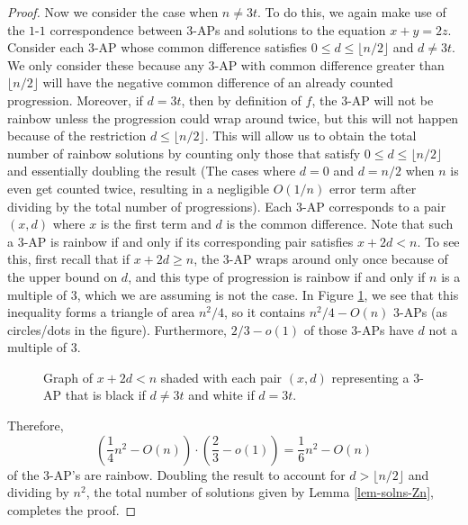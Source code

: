\begin{proof}
    Now we consider the case when $n \neq 3t$. To do this, we again make use of the $1$-$1$ correspondence between $3$-APs and solutions to the equation $x + y = 2z$. Consider each $3$-AP whose common difference satisfies $0 \leq d \leq \lfloor n/2 \rfloor$ and $d \neq 3t$. We only consider these because any $3$-AP with common difference greater than $\lfloor n/2 \rfloor$ will have the negative common difference of an already counted progression. Moreover, if $d = 3t$, then by definition of $f$, the $3$-AP will not be rainbow unless the progression could wrap around twice, but this will not happen because of the restriction $d \leq \lfloor n/2 \rfloor$. This will allow us to obtain the total number of rainbow solutions by counting only those that satisfy $0 \leq d \leq \lfloor n/2 \rfloor$ and essentially doubling the result (The cases where $d = 0$ and $d = n/2$ when $n$ is even get counted twice, resulting in a negligible $O(1/n)$ error term after dividing by the total number of progressions). Each $3$-AP corresponds to a pair $(x, d)$ where $x$ is the first term and $d$ is the common difference. Note that such a $3$-AP is rainbow if and only if its corresponding pair satisfies $x + 2d < n$. To see this, first recall that if $x + 2d \geq n$, the 3-AP wraps around only once because of the upper bound on $d$, and this type of progression is rainbow if and only if $n$ is a multiple of 3, which we are assuming is not the case. In Figure \ref{fig:graph}, we see that this inequality forms a triangle of area $n^2/4$, so it contains $n^2/4 - O(n)$ 3-APs (as circles/dots in the figure). Furthermore, $2/3 - o(1)$ of those $3$-APs have $d$ not a multiple of $3$. 
    \begin{figure}%
        \centering
{}
        \caption{Graph of $x + 2d < n$ shaded with each pair $(x, d)$ representing a $3$-AP that is black if $d \neq 3t$ and white if $d = 3t$.}
        \label{fig:graph}
    \end{figure}
    Therefore, \begin{equation}
        \left(\frac{1}{4}n^2 - O(n)\right) \cdot \left(\frac{2}{3} - o(1)\right) = \frac{1}{6}n^2 - O(n)
    \end{equation} of the $3$-AP's are rainbow. Doubling the result to account for $d > \lfloor n/2 \rfloor$
    and dividing by $n^2$, the total number of solutions given by Lemma \ref{lem-solns-Zn}, completes the proof.
    \end{proof}

